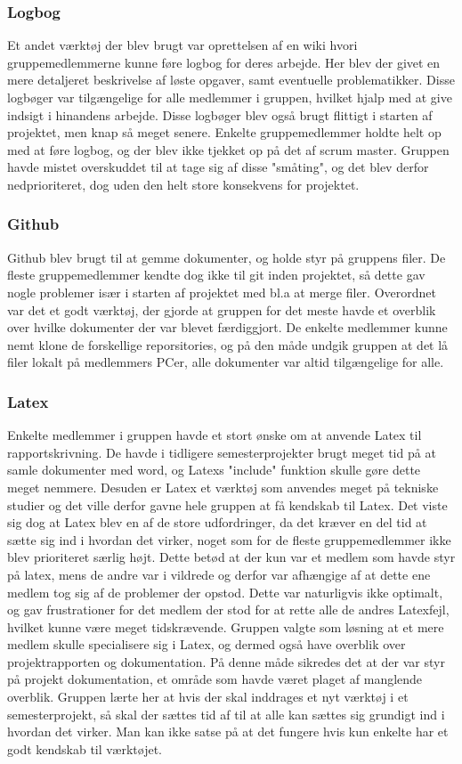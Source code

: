 \subsubsection{Logbog}
Et andet værktøj der blev brugt var oprettelsen af en wiki hvori gruppemedlemmerne kunne føre logbog for deres arbejde. Her blev der givet en mere detaljeret beskrivelse af løste opgaver, samt eventuelle problematikker. Disse logbøger var tilgængelige for alle medlemmer i gruppen, hvilket hjalp med at give indsigt i hinandens arbejde. Disse logbøger blev også brugt flittigt i starten af projektet, men knap så meget senere. Enkelte gruppemedlemmer holdte helt op med at føre logbog, og der blev ikke tjekket op på det af scrum master. Gruppen havde mistet overskuddet til at tage sig af disse "småting", og det blev derfor
nedprioriteret, dog uden den helt store konsekvens for projektet.

\subsubsection{Github}
Github blev brugt til at gemme dokumenter, og holde styr på gruppens filer. De fleste gruppemedlemmer kendte dog ikke til git inden projektet, 
så dette gav nogle problemer især i starten af projektet med bl.a at merge filer. Overordnet var det et godt værktøj, der gjorde at gruppen for det meste havde et overblik over hvilke dokumenter der var blevet færdiggjort. De enkelte medlemmer kunne nemt klone de forskellige reporsitories, og på den måde undgik gruppen at det lå filer lokalt på medlemmers PCer, alle dokumenter var altid tilgængelige for alle.  

\subsubsection{Latex}
Enkelte medlemmer i gruppen havde et stort ønske om at anvende Latex til rapportskrivning. De havde i tidligere semesterprojekter brugt meget tid på at samle dokumenter med word, og Latexs "include" funktion skulle gøre dette meget nemmere. Desuden er Latex et værktøj som anvendes meget på tekniske studier og det ville derfor gavne hele gruppen at få kendskab til Latex. Det viste sig dog at Latex blev en af de store udfordringer, da det kræver en del tid at sætte sig ind i hvordan det virker, noget som for de fleste gruppemedlemmer ikke blev prioriteret særlig højt. Dette betød at der kun var et medlem som havde styr på latex, mens de andre var i vildrede og derfor var afhængige af at dette ene medlem tog sig af de problemer der opstod. Dette var naturligvis ikke optimalt, og gav frustrationer for det medlem der stod for at rette alle de andres Latexfejl, hvilket kunne være meget tidskrævende. Gruppen valgte som løsning at et mere medlem skulle specialisere sig i Latex, og dermed også have overblik over projektrapporten og dokumentation. På denne måde sikredes det at der var styr på projekt dokumentation, et område som havde været plaget af manglende overblik. Gruppen lærte her at hvis der skal inddrages et nyt værktøj i et semesterprojekt, så skal der sættes tid af til at alle kan sættes sig grundigt ind i hvordan det virker. Man kan ikke satse på at det fungere hvis kun enkelte har et godt kendskab til værktøjet. 

